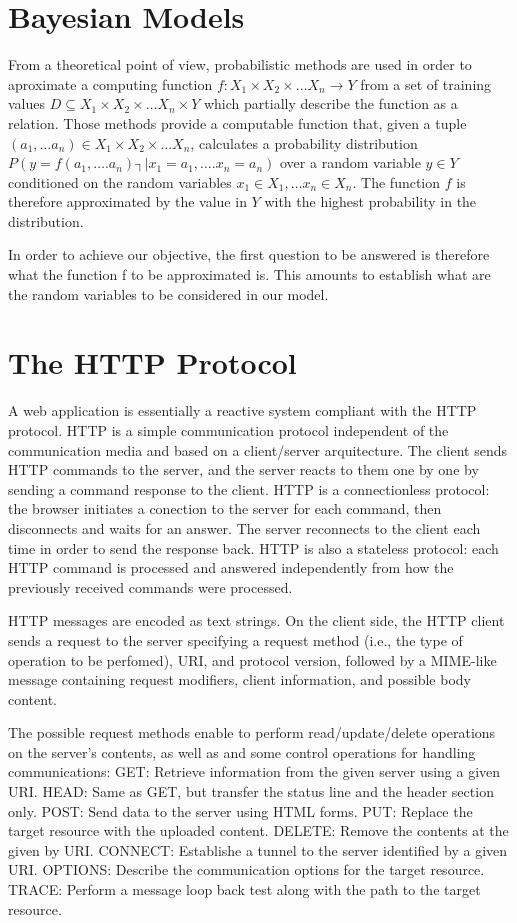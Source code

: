 \documentclass[runningheads,a4paper]{llncs}
\begin{document}
\section{Bayesian Models}

From a theoretical point of view, probabilistic methods are used in order to aproximate a computing function $f : X_1 \times X_2  \times \ldots X_n \rightarrow Y$ from a set of training values $D \subseteq X_1 \times X_2  \times \ldots X_n \times Y$  which partially describe the function as a relation. Those methods provide a computable function that, given a tuple $(a_1,\ldots a_n ) \in  X_1  \times X_2  \times … X_n$, calculates a probability distribution $P(y=f(a_1,….a_n )  ┤|  x_1=a_1,….x_n=a_n)$ over a random variable $y\in Y$ conditioned on the random variables $x_1\in X_1,… x_n\in X_n$. The function $f$ is therefore approximated by the value in $Y$ with the highest probability in the distribution.

In order to achieve our objective, the first question to be answered is therefore what the function f to be approximated is. This amounts to establish what are the random variables to be considered in our model. 


\section{The HTTP Protocol}

A web application is essentially a reactive system compliant with the HTTP protocol. HTTP is a simple communication protocol independent of the communication media and based on a client/server arquitecture. The client sends HTTP commands to the server, and the server reacts to them one by one by sending a command response to the client. HTTP is a connectionless protocol: the browser initiates a conection to the server for each command, then disconnects and waits for an answer. The server reconnects to the client each time in order to send the response back. HTTP is also a stateless protocol: each HTTP command is processed and answered independently from how the previously received commands were processed.

HTTP messages are encoded as text strings. On the client side, the HTTP client sends a request to the server specifying a request method (i.e., the type of operation to be perfomed), URI, and protocol version, followed by a MIME-like message containing request modifiers, client information, and possible body content. 

The possible request methods enable to perform read/update/delete operations on the server’s contents, as well as and some control operations for handling communications:
	GET: Retrieve information from the given server using a given URI. 
	HEAD: Same as GET, but transfer the status line and the header section only.
	POST: Send data to the server using HTML forms.
	PUT: Replace the target resource with the uploaded content.
	DELETE: Remove the contents at the given by URI.
	CONNECT: Establishe a tunnel to the server identified by a given URI.
	OPTIONS: Describe the communication options for the target resource.
	TRACE: Perform a message loop back test along with the path to the target resource.
\end{document}
